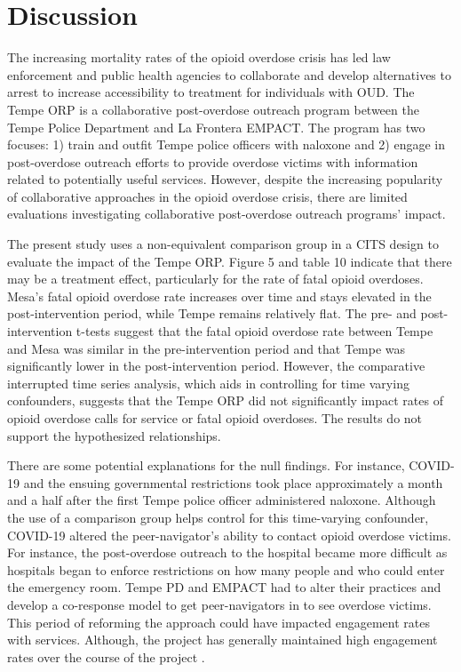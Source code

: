 \section{\centering Discussion}
The increasing mortality rates of the opioid overdose crisis has led law enforcement and public health agencies to collaborate and develop alternatives to arrest to increase accessibility to treatment for individuals with OUD. The Tempe ORP is a collaborative post-overdose outreach program between the Tempe Police Department and La Frontera EMPACT. The program has two focuses: 1) train and outfit Tempe police officers with naloxone and 2) engage in post-overdose outreach efforts to provide overdose victims with information related to potentially useful services. However, despite the increasing popularity of collaborative approaches in the opioid overdose crisis, there are limited evaluations investigating collaborative post-overdose outreach programs' impact.

The present study uses a non-equivalent comparison group in a CITS design to evaluate the impact of the Tempe ORP. Figure 5 and table 10 indicate that there may be a treatment effect, particularly for the rate of fatal opioid overdoses. Mesa's fatal opioid overdose rate increases over time and stays elevated in the post-intervention period, while Tempe remains relatively flat. The pre- and post-intervention t-tests suggest that the fatal opioid overdose rate between Tempe and Mesa was similar in the pre-intervention period and that Tempe was significantly lower in the post-intervention period. However, the comparative interrupted time series analysis, which aids in controlling for time varying confounders, suggests that the Tempe ORP did not significantly impact rates of opioid overdose calls for service or fatal opioid overdoses. The results do not support the hypothesized relationships. 

There are some potential explanations for the null findings. For instance, COVID-19 and the ensuing governmental restrictions took place approximately a month and a half after the first Tempe police officer administered naloxone. Although the use of a comparison group helps control for this time-varying confounder, COVID-19 altered the peer-navigator's ability to contact opioid overdose victims. For instance, the post-overdose outreach to the hospital became more difficult as hospitals began to enforce restrictions on how many people and who could enter the emergency room. Tempe PD and EMPACT had to alter their practices and develop a co-response model to get peer-navigators in to see overdose victims. This period of reforming the approach could have impacted engagement rates with services. Although, the project has generally maintained high engagement rates over the course of the project \parencite{watts_tempe_2023}.

